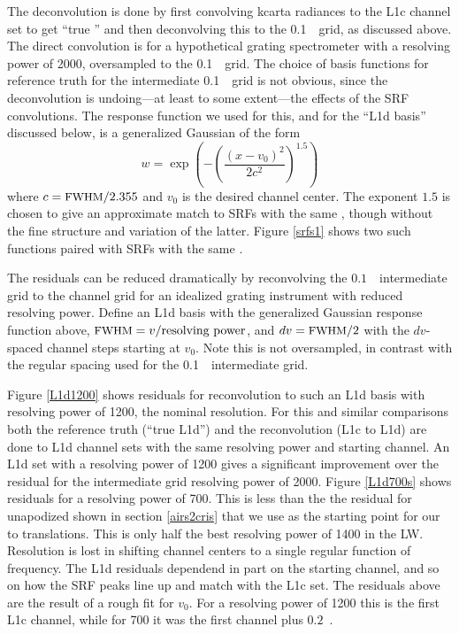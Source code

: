 \documentclass[11pt]{article}
\begin{document}
The deconvolution is done by first convolving kcarta radiances to the
{\airs} L1c channel set to get ``true {\airs}'' and then deconvolving
this to the 0.1~\wn\ grid, as discussed above.  The direct
convolution is for a hypothetical grating spectrometer with a
resolving power of 2000, oversampled to the 0.1~\wn\ grid.  The
choice of basis functions for reference truth for the intermediate
0.1~\wn\ grid is not obvious, since the deconvolution is undoing---at
least to some extent---the effects of the {\airs} SRF convolutions.
The response function we used for this, and for the ``L1d basis''
discussed below, is a generalized Gaussian of the form
\[w = \exp\left(-\left(\frac{(x - v_0)^2}{2c^2}\right)^{1.5}\right) \]
where $c=\mbox{\small FWHM} / 2.355$ and $v_0$ is the desired channel center.  The
exponent $1.5$ is chosen to give an approximate match to {\airs} SRFs
with the same \fwhm, though without the fine structure and variation
of the latter.  Figure \ref{srfs1} shows two such functions paired
with {\airs} SRFs with the same \fwhm.


The residuals can be reduced dramatically by reconvolving the
$0.1$~\wn\ intermediate grid to the channel grid for an idealized
grating instrument with reduced resolving power.  Define an L1d basis
with the generalized Gaussian response function above, $\mbox{\small FWHM} = v /
\hbox{resolving power}$, and $dv = \mbox{\small FWHM} / 2$ with the $dv$-spaced
channel steps starting at $v_0$.  Note this is not oversampled, in
contrast with the regular spacing used for the 0.1~\wn\ intermediate
grid.

Figure \ref{L1d1200} shows residuals for reconvolution to such an L1d
basis with resolving power of 1200, the nominal {\airs} resolution.
For this and similar comparisons both the reference truth (``true
L1d'') and the reconvolution (L1c to L1d) are done to L1d channel
sets with the same resolving power and starting channel.  An L1d set
with a resolving power of 1200 gives a significant improvement over
the residual for the intermediate grid resolving power of 2000.
Figure \ref{L1d700s} shows residuals for a resolving power of 700.
This is less than the the residual for unapodized {\cris} shown in
section \ref{airs2cris} that we use as the starting point for our
{\airs} to {\cris} translations.  This is only half the best {\airs}
resolving power of 1400 in the LW.  Resolution is lost in shifting
channel centers to a single regular function of frequency.  The L1d
residuals dependend in part on the starting channel, and so on how
the SRF peaks line up and match with the L1c set.  The residuals
above are the result of a rough fit for $v_0$.  For a resolving power
of 1200 this is the first L1c channel, while for 700 it was the first
channel plus $0.2$~\wn.
\end{document}
